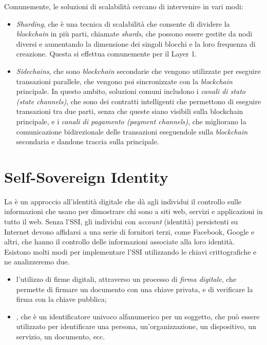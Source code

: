 Comunemente, le soluzioni di scalabilità cercano di intervenire in vari modi:
\begin{itemize}
    \item{\textit{Sharding}}, che è una tecnica di scalabilità che consente di dividere la \textit{blockchain} in più parti, chiamate \textit{shards}, che possono essere gestite da nodi diversi e aumentando
    la dimensione dei singoli blocchi e la loro frequenza di creazione. Questa si effettua comunemente per il Layer 1.
    \item{\textit{Sidechains}}, che sono \textit{blockchain} secondarie che vengono utilizzate per eseguire transazioni parallele, che vengono poi sincronizzate con la \textit{blockchain} principale.
    In questo ambito, soluzioni comuni includono i \textit{canali di stato (state channels)}, che sono dei contratti intelligenti che permettono di eseguire transazioni tra due parti, senza che queste siano visibili sulla blockchain principale,
    e i \textit{canali di pagamento (payment channels)}, che migliorano la comunicazione bidirezionale delle transazioni eseguendole sulla \textit{blockchain} secondaria e dandone traccia sulla principale.
\end{itemize}

\section{Self-Sovereign Identity}\label{sec:self-sovereign-identity}

La  è un approccio all'identità digitale che dà agli individui 
il controllo sulle informazioni che usano per dimostrare chi sono a siti web, servizi e applicazioni in tutto il web. 
Senza l'SSI, gli individui con \textit{account} (identità) persistenti su Internet devono affidarsi a una serie di fornitori terzi, come Facebook, Google e altri,
che hanno il controllo delle informazioni associate alla loro identità. \\

Esistono molti modi per implementare l'SSI utilizzando le chiavi crittografiche e ne analizzeremo due.
\begin{itemize}
    \item l'utilizzo di firme digitali, attraverso un processo di \textit{firma digitale}, che permette di firmare un documento con una chiave privata, e di verificare la firma con la chiave pubblica;
    \item {}, che è un identificatore univoco alfanumerico per un soggetto, che può essere utilizzato per identificare una persona, un'organizzazione, un dispositivo, un servizio, un documento, ecc.
\end{itemize}  

